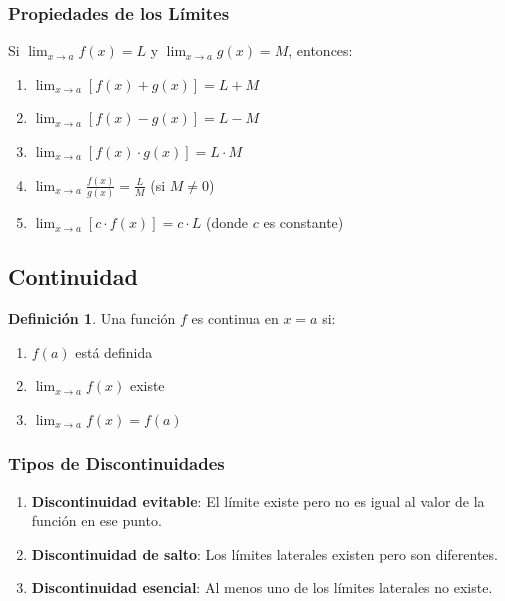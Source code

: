 \documentclass[12pt, a4paper, oneside]{book}
\theoremstyle{definition}
\newtheorem{definicion}{Definición}[chapter]
\begin{document}
\subsubsection{Propiedades de los Límites}

Si $\lim_{x \to a} f(x) = L$ y $\lim_{x \to a} g(x) = M$, entonces:

\begin{enumerate}
    \item $\lim_{x \to a} [f(x) + g(x)] = L + M$
    \item $\lim_{x \to a} [f(x) - g(x)] = L - M$
    \item $\lim_{x \to a} [f(x) \cdot g(x)] = L \cdot M$
    \item $\lim_{x \to a} \frac{f(x)}{g(x)} = \frac{L}{M}$ (si $M \neq 0$)
    \item $\lim_{x \to a} [c \cdot f(x)] = c \cdot L$ (donde $c$ es constante)
\end{enumerate}

\subsection{Continuidad}

\begin{definicion}
Una función $f$ es continua en $x = a$ si:
\begin{enumerate}
    \item $f(a)$ está definida
    \item $\lim_{x \to a} f(x)$ existe
    \item $\lim_{x \to a} f(x) = f(a)$
\end{enumerate}
\end{definicion}

\subsubsection{Tipos de Discontinuidades}

\begin{enumerate}
    \item \textbf{Discontinuidad evitable}: El límite existe pero no es igual al valor de la función en ese punto.
    \item \textbf{Discontinuidad de salto}: Los límites laterales existen pero son diferentes.
    \item \textbf{Discontinuidad esencial}: Al menos uno de los límites laterales no existe.
\end{enumerate}
\end{document}
